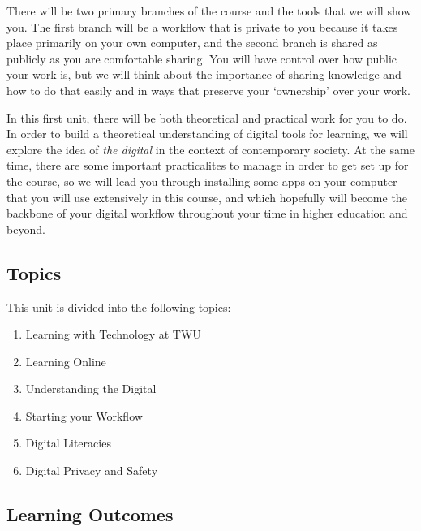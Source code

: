 \documentclass[
]{book}
\providecommand{\tightlist}{%
  \setlength{\itemsep}{0pt}\setlength{\parskip}{0pt}}
\theoremstyle{definition}
\theoremstyle{definition}
\theoremstyle{definition}
\theoremstyle{definition}
\theoremstyle{remark}
\begin{document}
There will be two primary branches of the course and the tools that we will show you. The first branch will be a workflow that is private to you because it takes place primarily on your own computer, and the second branch is shared as publicly as you are comfortable sharing. You will have control over how public your work is, but we will think about the importance of sharing knowledge and how to do that easily and in ways that preserve your `ownership' over your work.

In this first unit, there will be both theoretical and practical work for you to do. In order to build a theoretical understanding of digital tools for learning, we will explore the idea of \emph{the digital} in the context of contemporary society. At the same time, there are some important practicalites to manage in order to get set up for the course, so we will lead you through installing some apps on your computer that you will use extensively in this course, and which hopefully will become the backbone of your digital workflow throughout your time in higher education and beyond.

\hypertarget{topics}{%
\subsection*{Topics}\label{topics}}

This unit is divided into the following topics:

\begin{enumerate}
\def\labelenumi{\arabic{enumi}.}
\tightlist
\item
  Learning with Technology at TWU\\
\item
  Learning Online
\item
  Understanding the Digital\\
\item
  Starting your Workflow\\
\item
  Digital Literacies\\
\item
  Digital Privacy and Safety
\end{enumerate}

\hypertarget{learning-outcomes}{%
\subsection*{Learning Outcomes}\label{learning-outcomes}}
\end{document}
